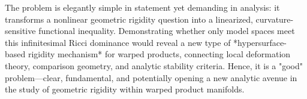 The problem is elegantly simple in statement yet demanding in analysis: it transforms a nonlinear geometric rigidity question into a linearized, curvature-sensitive functional inequality. Demonstrating whether only model spaces meet this infinitesimal Ricci dominance would reveal a new type of *hypersurface-based rigidity mechanism* for warped products, connecting local deformation theory, comparison geometry, and analytic stability criteria.  
Hence, it is a "good" problem—clear, fundamental, and potentially opening a new analytic avenue in the study of geometric rigidity within warped product manifolds.